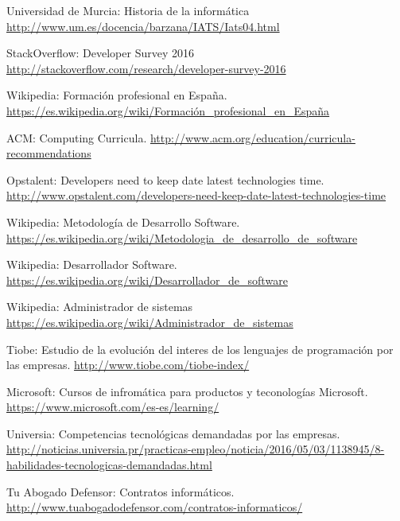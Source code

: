 \documentclass[12pt, a4paper]{report}
\begin{document}
        
	\begin{thebibliography}{9}
    
        Universidad de Murcia: Historia de la informática \url{http://www.um.es/docencia/barzana/IATS/Iats04.html}
        
        StackOverflow: Developer Survey 2016 \url{http://stackoverflow.com/research/developer-survey-2016}
        
		Wikipedia: Formación profesional en España. \url{https://es.wikipedia.org/wiki/Formación_profesional_en_España}
        
        ACM: Computing Curricula. \url{http://www.acm.org/education/curricula-recommendations}
        
        Opstalent: Developers need to keep date latest technologies time. \url{http://www.opstalent.com/developers-need-keep-date-latest-technologies-time}
        
		Wikipedia: Metodología de Desarrollo Software. \url{https://es.wikipedia.org/wiki/Metodologia_de_desarrollo_de_software}
        
		Wikipedia: Desarrollador Software. \url{https://es.wikipedia.org/wiki/Desarrollador_de_software}
        
        Wikipedia: Administrador de sistemas \url{https://es.wikipedia.org/wiki/Administrador_de_sistemas}
        
		Tiobe: Estudio de la evolución del interes de los lenguajes de programación por las empresas. \url{http://www.tiobe.com/tiobe-index/}
        
		Microsoft: Cursos de infromática para productos y teconologías Microsoft. \url{https://www.microsoft.com/es-es/learning/}
        
		Universia: Competencias tecnológicas demandadas por las empresas. \url{http://noticias.universia.pr/practicas-empleo/noticia/2016/05/03/1138945/8-habilidades-tecnologicas-demandadas.html}
        
		Tu Abogado Defensor: Contratos informáticos. \url{http://www.tuabogadodefensor.com/contratos-informaticos/}
        
        
        
	\end{thebibliography}
  
\end{document}
